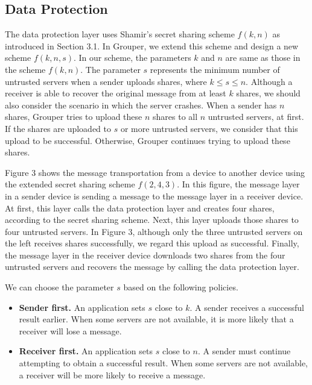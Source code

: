 \documentclass{sig-alternate-05-2015}
\begin{document}
\subsection{Data Protection}

The data protection layer uses Shamir's secret sharing scheme $f(k, n)$ as introduced in Section 3.1.
In Grouper, we extend this scheme and design a new scheme $ f(k, n, s)$.
In our scheme, the parameters $k$ and $n$ are same as those in the scheme $f(k, n)$. 
The parameter $s$ represents the minimum number of untrusted servers when a sender uploads shares, where $k \leq s \leq n$.
Although a receiver is able to recover the original message from at least $k$ shares, we should also consider the scenario in which the server crashes. 
When a sender has $n$ shares, Grouper tries to upload these $n$ shares to all $n$ untrusted servers, at first. 
If the shares are uploaded to $s$ or more untrusted servers, we consider that this upload to be successful.
Otherwise, Grouper continues trying to upload these shares.

Figure 3 shows the message transportation from a device to another device using the extended secret sharing scheme $f(2, 4, 3)$.
In this figure, the message layer in a sender device is sending a message to the message layer in a receiver device.
At first, this layer calls the data protection layer and creates four shares, according to the secret sharing scheme.
Next, this layer uploads those shares to four untrusted servers.
In Figure 3, although only the three untrusted servers on the left receives shares successfully, we regard this upload as successful.
Finally, the message layer in the receiver device downloads two shares from the four untrusted servers and recovers the message by calling the data protection layer.

We can choose the parameter $s$ based on the following policies.

\begin{itemize}[leftmargin=7mm]
	\setlength{\itemsep}{1pt}
	\setlength{\parskip}{0pt}
	\setlength{\parsep}{0pt}
	\item \textbf{Sender first.} 
	An application sets $s$ close to $k$. 
	A sender receives a successful result earlier.
	When some servers are not available, it is more likely that a receiver will lose a message.
	\item \textbf{Receiver first.}
	An application sets $s$ close to $n$. 
	A sender must continue attempting to obtain a successful result.
	When some servers are not available, a receiver will be more likely to receive a message.
\end{itemize}
\end{document}

